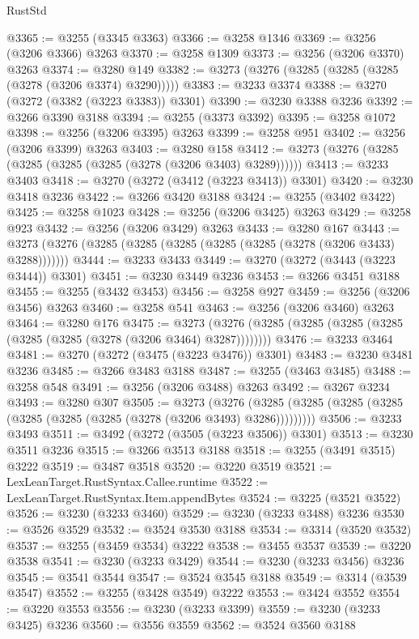 \begin{lexlean}{RustStd}
\begin{coremodule}
@3365 := @3255 (@3345 @3363)
@3366 := @3258 @1346
@3369 := @3256 (@3206 @3366) @3263
@3370 := @3258 @1309
@3373 := @3256 (@3206 @3370) @3263
@3374 := @3280 @149
@3382 := @3273 (@3276 (@3285 (@3285 (@3285 (@3278 (@3206 @3374) @3290)))))
@3383 := @3233 @3374
@3388 := @3270 (@3272 (@3382 (@3223 @3383)) @3301)
@3390 := @3230 @3388 @3236
@3392 := @3266 @3390 @3188
@3394 := @3255 (@3373 @3392)
@3395 := @3258 @1072
@3398 := @3256 (@3206 @3395) @3263
@3399 := @3258 @951
@3402 := @3256 (@3206 @3399) @3263
@3403 := @3280 @158
@3412 := @3273 (@3276 (@3285 (@3285 (@3285 (@3285 (@3278 (@3206 @3403) @3289))))))
@3413 := @3233 @3403
@3418 := @3270 (@3272 (@3412 (@3223 @3413)) @3301)
@3420 := @3230 @3418 @3236
@3422 := @3266 @3420 @3188
@3424 := @3255 (@3402 @3422)
@3425 := @3258 @1023
@3428 := @3256 (@3206 @3425) @3263
@3429 := @3258 @923
@3432 := @3256 (@3206 @3429) @3263
@3433 := @3280 @167
@3443 := @3273 (@3276 (@3285 (@3285 (@3285 (@3285 (@3285 (@3278 (@3206 @3433) @3288)))))))
@3444 := @3233 @3433
@3449 := @3270 (@3272 (@3443 (@3223 @3444)) @3301)
@3451 := @3230 @3449 @3236
@3453 := @3266 @3451 @3188
@3455 := @3255 (@3432 @3453)
@3456 := @3258 @927
@3459 := @3256 (@3206 @3456) @3263
@3460 := @3258 @541
@3463 := @3256 (@3206 @3460) @3263
@3464 := @3280 @176
@3475 := @3273 (@3276 (@3285 (@3285 (@3285 (@3285 (@3285 (@3285 (@3278 (@3206 @3464) @3287))))))))
@3476 := @3233 @3464
@3481 := @3270 (@3272 (@3475 (@3223 @3476)) @3301)
@3483 := @3230 @3481 @3236
@3485 := @3266 @3483 @3188
@3487 := @3255 (@3463 @3485)
@3488 := @3258 @548
@3491 := @3256 (@3206 @3488) @3263
@3492 := @3267 @3234
@3493 := @3280 @307
@3505 := @3273
    (@3276 (@3285 (@3285 (@3285 (@3285 (@3285 (@3285 (@3285 (@3278 (@3206 @3493) @3286)))))))))
@3506 := @3233 @3493
@3511 := @3492 (@3272 (@3505 (@3223 @3506)) @3301)
@3513 := @3230 @3511 @3236
@3515 := @3266 @3513 @3188
@3518 := @3255 (@3491 @3515) @3222
@3519 := @3487 @3518
@3520 := @3220 @3519
@3521 := LexLeanTarget.RustSyntax.Callee.runtime
@3522 := LexLeanTarget.RustSyntax.Item.appendBytes
@3524 := @3225 (@3521 @3522)
@3526 := @3230 (@3233 @3460)
@3529 := @3230 (@3233 @3488) @3236
@3530 := @3526 @3529
@3532 := @3524 @3530 @3188
@3534 := @3314 (@3520 @3532)
@3537 := @3255 (@3459 @3534) @3222
@3538 := @3455 @3537
@3539 := @3220 @3538
@3541 := @3230 (@3233 @3429)
@3544 := @3230 (@3233 @3456) @3236
@3545 := @3541 @3544
@3547 := @3524 @3545 @3188
@3549 := @3314 (@3539 @3547)
@3552 := @3255 (@3428 @3549) @3222
@3553 := @3424 @3552
@3554 := @3220 @3553
@3556 := @3230 (@3233 @3399)
@3559 := @3230 (@3233 @3425) @3236
@3560 := @3556 @3559
@3562 := @3524 @3560 @3188

\end{coremodule}
\end{lexlean}
